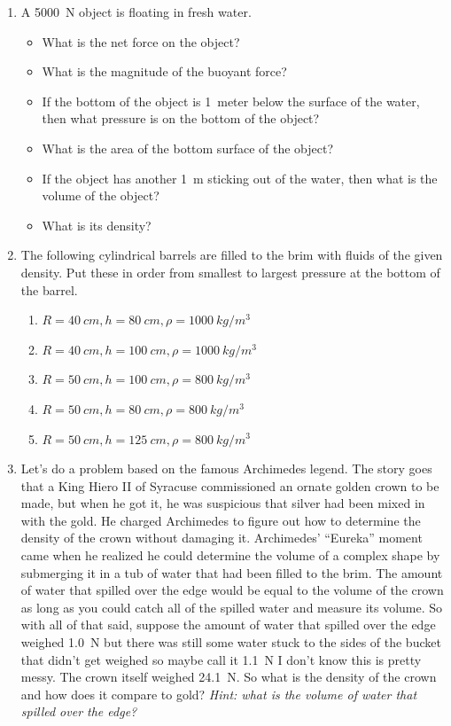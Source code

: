 \begin{enumerate}
	\item
	A \SI{5000}{\newton} object is floating in fresh water. 
	\begin{itemize}
		\setlength\itemsep{1 in}
		\item What is the net force on the object?
		\item What is the magnitude of the buoyant force?
		\item If the bottom of the object is \SI{1}{meter} below the surface of the water, then what pressure is on the bottom of the object?
		\item What is the area of the bottom surface of the object?
		\item If the object has another \SI{1}{\meter} sticking out of the water, then what is the volume of the object?
		\item What is its density?	
	\end{itemize}
	
	\item
	The following cylindrical barrels are filled to the brim with fluids of the given density. Put these in order from smallest to largest pressure at the bottom of the barrel.
	\begin{enumerate}
		\item $R=\SI{40}{cm}, h=\SI{80}{cm}, \rho=\SI{1000}{kg/m^3}$
		\item $R=\SI{40}{cm}, h=\SI{100}{cm}, \rho=\SI{1000}{kg/m^3}$
		\item $R=\SI{50}{cm}, h=\SI{100}{cm}, \rho=\SI{800}{kg/m^3}$
		\item $R=\SI{50}{cm}, h=\SI{80}{cm}, \rho=\SI{800}{kg/m^3}$
		\item $R=\SI{50}{cm}, h=\SI{125}{cm}, \rho=\SI{800}{kg/m^3}$
	\end{enumerate}\bigskip
	
	
	\item 
	Let's do a problem based on the famous Archimedes legend. The story goes that a King Hiero II of Syracuse commissioned an ornate golden crown to be made, but when he got it, he was suspicious that silver had been mixed in with the gold. He charged Archimedes to figure out how to determine the density of the crown without damaging it. Archimedes' ``Eureka'' moment came when he realized he could determine the volume of a complex shape by submerging it in a tub of water that had been filled to the brim. The amount of water that spilled over the edge would be equal to the volume of the crown as long as you could catch all of the spilled water and measure its volume. So with all of that said, suppose the amount of water that spilled over the edge weighed \SI{1.0}{\newton} but there was still some water stuck to the sides of the bucket that didn't get weighed so maybe call it \SI{1.1}{\newton} I don't know this is pretty messy. The crown itself weighed \SI{24.1}{\newton}. So what is the density of the crown and how does it compare to gold? \emph{Hint: what is the volume of water that spilled over the edge?}
	

\end{enumerate}

